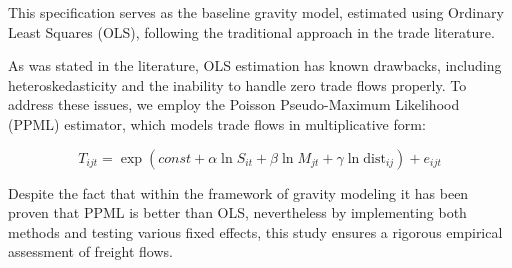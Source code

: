 This specification serves as the baseline gravity model, estimated using Ordinary Least Squares (OLS), following the traditional approach in the trade literature.

As was stated in the literature, OLS estimation has known drawbacks, including heteroskedasticity and the inability to handle zero trade flows properly. To address these issues, we employ the Poisson Pseudo-Maximum Likelihood (PPML) estimator, which models trade flows in multiplicative form:

\begin{equation}
T_{ijt} = \exp \left( const + \alpha \ln S_{it} + \beta \ln M_{jt} + \gamma \ln \text{dist}_{ij} \right) + e_{ijt}
\end{equation}


Despite the fact that within the framework of gravity modeling it has been proven that PPML is better than OLS, nevertheless by implementing both methods and testing various fixed effects, this study ensures a rigorous empirical assessment of freight flows. 
